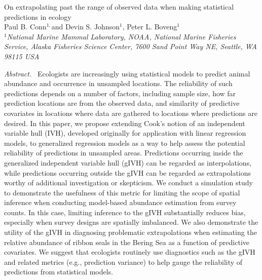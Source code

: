 \documentclass[12pt,english]{article}
\begin{document}
\begin{spacing}{1.9}

\begin{center}
On extrapolating past the range of observed data when making statistical predictions in ecology
\bigskip\\
\normalsize
{\sc Paul B. Conn$^{1,}$\footnotemark[2] and
Devin S. Johnson$^1$, Peter L. Boveng$^1$ }\smallskip\\
$^1${\em National Marine Mammal Laboratory, NOAA, National Marine Fisheries Service,
Alaska Fisheries Science Center, 7600 Sand Point Way NE, Seattle,
WA 98115 USA }\\ \medskip
\end{center}


\raggedright \setlength{\parindent}{0.3in}
{}
 \linenumbers


{\em Abstract.\ } Ecologists are increasingly using statistical models to predict animal abundance and occurrence in unsampled locations. The reliability of such predictions depends on a number of factors, including sample size, how far prediction locations are from the observed data, and similarity of predictive covariates in locations where data are gathered to locations where predictions are desired.  In this paper, we propose extending Cook's notion of an independent variable hull (IVH), developed originally for application with linear regression models, to generalized regression models as a way to help assess the potential reliability of predictions in unsampled areas.  Predictions occurring inside the generalized independent variable hull (gIVH) can be regarded as interpolations, while predictions occurring outside the gIVH can be regarded as extrapolations worthy of additional investigation or skepticism. We conduct a simulation study to demonstrate the usefulness of this metric for limiting the scope of spatial inference when conducting model-based abundance estimation from survey counts.  In this case, limiting inference to the gIVH substantially reduces bias, especially when survey designs are spatially imbalanced.  We also demonstrate the utility of the gIVH in diagnosing problematic extrapolations when estimating the relative abundance of ribbon seals in the Bering Sea as a function of predictive covariates.  We suggest that ecologists routinely use diagnostics such as the gIVH and related metrics (e.g., prediction variance) to help gauge the reliability of predictions from statistical models.




\end{spacing}
\end{document}
